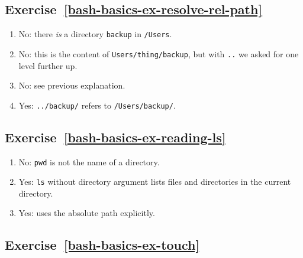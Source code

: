 \documentclass[
]{krantz}
\providecommand{\tightlist}{%
  \setlength{\itemsep}{0pt}\setlength{\parskip}{0pt}}
\begin{document}
\hypertarget{exercise-refbash-basics-ex-resolve-rel-path}{%
\subsection*{Exercise~\ref{bash-basics-ex-resolve-rel-path}}\label{exercise-refbash-basics-ex-resolve-rel-path}}


\begin{enumerate}
\def\labelenumi{\arabic{enumi}.}
\tightlist
\item
  No: there \emph{is} a directory \texttt{backup} in \texttt{/Users}.
\item
  No: this is the content of \texttt{Users/thing/backup},
  but with \texttt{..} we asked for one level further up.
\item
  No: see previous explanation.
\item
  Yes: \texttt{../backup/} refers to \texttt{/Users/backup/}.
\end{enumerate}

\hypertarget{exercise-refbash-basics-ex-reading-ls}{%
\subsection*{Exercise~\ref{bash-basics-ex-reading-ls}}\label{exercise-refbash-basics-ex-reading-ls}}


\begin{enumerate}
\def\labelenumi{\arabic{enumi}.}
\tightlist
\item
  No: \texttt{pwd} is not the name of a directory.
\item
  Yes: \texttt{ls} without directory argument lists files and directories
  in the current directory.
\item
  Yes: uses the absolute path explicitly.
\end{enumerate}

\hypertarget{exercise-refbash-basics-ex-touch}{%
\subsection*{Exercise~\ref{bash-basics-ex-touch}}\label{exercise-refbash-basics-ex-touch}}
\end{document}
